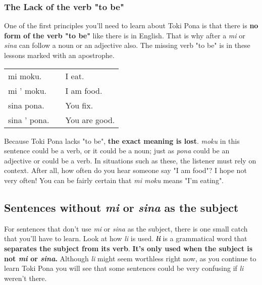 \newpage
\subsubsection*{The Lack of the verb "to be"}
%
One of the first principles you'll need to learn about Toki Pona is that there is \textbf{no form of the verb "to be"} like there is in English. 
That is why after a \textit{mi} or \textit{sina} can follow a noun or an adjective also. 
The missing verb "to be" is in these lessons marked with an apostrophe. 

\begin{supertabular}{p{5cm}|ll}
mi moku. && I eat.  \\
mi ' moku. && I am food. \\  %
sina pona. && You fix. \\
sina ' pona. && You are good. \\  %
\end{supertabular} 

Because Toki Pona lacks "to be", \textbf{the exact meaning is lost}. 
\textit{moku} in this sentence could be a verb, or it could be a noun; just as \textit{pona} could be an adjective or could be a verb. 
In situations such as these, the listener must rely on context. 
After all, how often do you hear someone say "I am food"? 
I hope not very often! You can be fairly certain that \textit{mi moku} means "I'm eating". 

\subsection*{Sentences without \textit{mi} or \textit{sina} as the subject}
%
For sentences that don't use \textit{mi} or \textit{sina} as the subject, there is one small catch that you'll have to learn. 
Look at how \textit{li} is used. 
\textbf{\textit{li}} is a grammatical word that \textbf{separates the subject from its verb}. 
\textbf{It's only used when the subject is not \textit{mi} or \textit{sina}.} 
Although \textit{li} might seem worthless right now, as you continue to learn Toki Pona you will see that some sentences could be very confusing if \textit{li} weren't there. 

